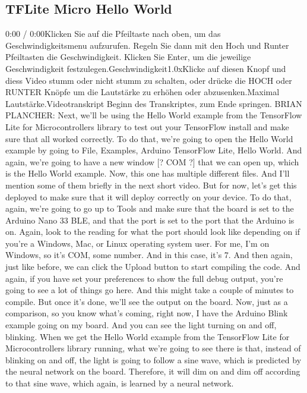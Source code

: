 \subsection{TFLite Micro Hello World}

0:00 / 0:00Klicken Sie auf die Pfeiltaste nach oben, um das Geschwindigkeitsmenu aufzurufen. Regeln Sie dann mit den Hoch und Runter Pfeiltasten die Geschwindigkeit. Klicken Sie Enter, um die jeweilige Geschwindigkeit festzulegen.Geschwindigkeit1.0xKlicke auf diesen Knopf und diess Video stumm oder nicht stumm zu schalten, oder drücke die HOCH oder RUNTER Knöpfe um die Lautstärke zu erhöhen oder abzusenken.Maximal Lautstärke.Videotranskript
Beginn des Transkriptes, zum Ende springen.
BRIAN PLANCHER: Next, we'll be using the Hello World example from the TensorFlow
Lite for Microcontrollers library to test out your TensorFlow
install and make sure that all worked correctly.
To do that, we're going to open the Hello World
example by going to File, Examples, Arduino TensorFlow Lite, Hello World.
And again, we're going to have a new window [? COM ?] that we can open up,
which is the Hello World example.
Now, this one has multiple different files.
And I'll mention some of them briefly in the next short video.
But for now, let's get this deployed to make sure that it will deploy correctly
on your device.
To do that, again, we're going to go up to Tools
and make sure that the board is set to the Arduino Nano 33 BLE,
and that the port is set to the port that the Arduino is on.
Again, look to the reading for what the port should
look like depending on if you're a Windows, Mac, or Linux operating system
user.
For me, I'm on Windows, so it's COM, some number.
And in this case, it's 7.
And then again, just like before, we can click the Upload
button to start compiling the code.
And again, if you have set your preferences
to show the full debug output, you're going to see a lot of things go here.
And this might take a couple of minutes to compile.
But once it's done, we'll see the output on the board.
Now, just as a comparison, so you know what's coming, right now,
I have the Arduino Blink example going on my board.
And you can see the light turning on and off, blinking.
When we get the Hello World example from the TensorFlow
Lite for Microcontrollers library running,
what we're going to see there is that, instead of blinking on and off,
the light is going to follow a sine wave, which is predicted
by the neural network on the board.
Therefore, it will dim on and dim off according to that sine wave, which
again, is learned by a neural network.
